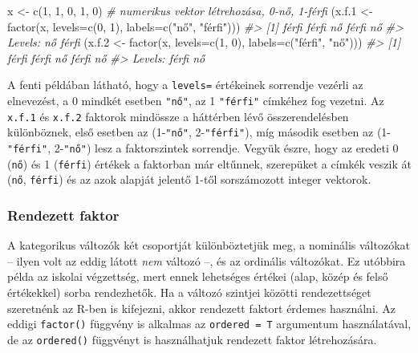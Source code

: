 \documentclass[
]{book}
\newenvironment{Shaded}{\begin{snugshade}}{\end{snugshade}}
\newcommand{\AttributeTok}[1]{\textcolor[rgb]{0.77,0.63,0.00}{#1}}
\newcommand{\CommentTok}[1]{\textcolor[rgb]{0.56,0.35,0.01}{\textit{#1}}}
\newcommand{\DecValTok}[1]{\textcolor[rgb]{0.00,0.00,0.81}{#1}}
\newcommand{\FloatTok}[1]{\textcolor[rgb]{0.00,0.00,0.81}{#1}}
\newcommand{\FunctionTok}[1]{\textcolor[rgb]{0.00,0.00,0.00}{#1}}
\newcommand{\NormalTok}[1]{#1}
\newcommand{\OtherTok}[1]{\textcolor[rgb]{0.56,0.35,0.01}{#1}}
\newcommand{\StringTok}[1]{\textcolor[rgb]{0.31,0.60,0.02}{#1}}
\begin{document}
\begin{Shaded}
\begin{Highlighting}[]
\NormalTok{x }\OtherTok{\textless{}{-}} \FunctionTok{c}\NormalTok{(}\DecValTok{1}\NormalTok{, }\DecValTok{1}\NormalTok{, }\DecValTok{0}\NormalTok{, }\DecValTok{1}\NormalTok{, }\DecValTok{0}\NormalTok{)     }\CommentTok{\# numerikus vektor létrehozása, 0{-}nő, 1{-}férfi}
\NormalTok{(x.f}\FloatTok{.1} \OtherTok{\textless{}{-}} \FunctionTok{factor}\NormalTok{(x, }\AttributeTok{levels=}\FunctionTok{c}\NormalTok{(}\DecValTok{0}\NormalTok{, }\DecValTok{1}\NormalTok{), }
                    \AttributeTok{labels=}\FunctionTok{c}\NormalTok{(}\StringTok{"nő"}\NormalTok{, }\StringTok{"férfi"}\NormalTok{)))}
\CommentTok{\#\textgreater{} [1] férfi férfi nő    férfi nő   }
\CommentTok{\#\textgreater{} Levels: nő férfi}
\NormalTok{(x.f}\FloatTok{.2} \OtherTok{\textless{}{-}} \FunctionTok{factor}\NormalTok{(x, }\AttributeTok{levels=}\FunctionTok{c}\NormalTok{(}\DecValTok{1}\NormalTok{, }\DecValTok{0}\NormalTok{), }
                    \AttributeTok{labels=}\FunctionTok{c}\NormalTok{(}\StringTok{"férfi"}\NormalTok{, }\StringTok{"nő"}\NormalTok{)))}
\CommentTok{\#\textgreater{} [1] férfi férfi nő    férfi nő   }
\CommentTok{\#\textgreater{} Levels: férfi nő}
\end{Highlighting}
\end{Shaded}

A fenti példában látható, hogy a \texttt{levels=} értékeinek sorrendje vezérli az elnevezést, a 0 mindkét esetben \texttt{"nő"}, az 1 \texttt{"férfi"} címkéhez fog vezetni. Az \texttt{x.f.1} és \texttt{x.f.2} faktorok mindössze a háttérben lévő összerendelésben különböznek, első esetben az (1-\texttt{"nő"}, 2-\texttt{"férfi"}), míg második esetben az (1-\texttt{"férfi"}, 2-\texttt{"nő"}) lesz a faktorszintek sorrendje. Vegyük észre, hogy az eredeti 0 (\texttt{nő}) és 1 (\texttt{férfi}) értékek a faktorban már eltűnnek, szerepüket a címkék veszik át (\texttt{nő}, \texttt{férfi}) és az azok alapját jelentő 1-től sorszámozott integer vektorok.

\hypertarget{rendezett-faktor}{%
\subsubsection{Rendezett faktor}\label{rendezett-faktor}}

A kategorikus változók két csoportját különböztetjük meg, a nominális változókat -- ilyen volt az eddig látott \emph{nem} változó --, és az ordinális változókat. Ez utóbbira példa az iskolai végzettség, mert ennek lehetséges értékei (alap, közép és felső értékekkel) sorba rendezhetők. Ha a változó szintjei közötti rendezettséget szeretnénk az R-ben is kifejezni, akkor rendezett faktort érdemes használni. Az eddigi \texttt{factor()} függvény is alkalmas az \texttt{ordered\ =\ T} argumentum használatával, de az \texttt{ordered()} függvényt is használhatjuk rendezett faktor létrehozására.
\end{document}
